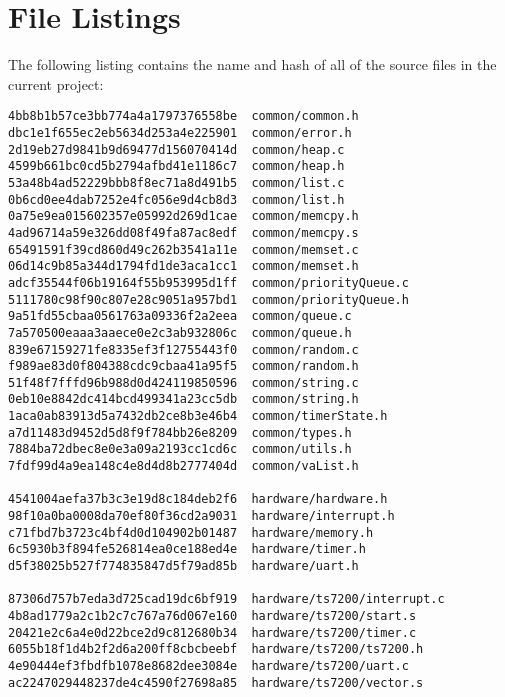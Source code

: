 \documentclass[twoside,a4paper]{refart}
\begin{document}
\section{File Listings}
The following listing contains the name and hash of all of the source files in the current project:
\begin{verbatim}
4bb8b1b57ce3bb774a4a1797376558be  common/common.h
dbc1e1f655ec2eb5634d253a4e225901  common/error.h
2d19eb27d9841b9d69477d156070414d  common/heap.c
4599b661bc0cd5b2794afbd41e1186c7  common/heap.h
53a48b4ad52229bbb8f8ec71a8d491b5  common/list.c
0b6cd0ee4dab7252e4fc056e9d4cb8d3  common/list.h
0a75e9ea015602357e05992d269d1cae  common/memcpy.h
4ad96714a59e326dd08f49fa87ac8edf  common/memcpy.s
65491591f39cd860d49c262b3541a11e  common/memset.c
06d14c9b85a344d1794fd1de3aca1cc1  common/memset.h
adcf35544f06b19164f55b953995d1ff  common/priorityQueue.c
5111780c98f90c807e28c9051a957bd1  common/priorityQueue.h
9a51fd55cbaa0561763a09336f2a2eea  common/queue.c
7a570500eaaa3aaece0e2c3ab932806c  common/queue.h
839e67159271fe8335ef3f12755443f0  common/random.c
f989ae83d0f804388cdc9cbaa41a95f5  common/random.h
51f48f7fffd96b988d0d424119850596  common/string.c
0eb10e8842dc414bcd499341a23cc5db  common/string.h
1aca0ab83913d5a7432db2ce8b3e46b4  common/timerState.h
a7d11483d9452d5d8f9f784bb26e8209  common/types.h
7884ba72dbec8e0e3a09a2193cc1cd6c  common/utils.h
7fdf99d4a9ea148c4e8d4d8b2777404d  common/vaList.h

4541004aefa37b3c3e19d8c184deb2f6  hardware/hardware.h
98f10a0ba0008da70ef80f36cd2a9031  hardware/interrupt.h
c71fbd7b3723c4bf4d0d104902b01487  hardware/memory.h
6c5930b3f894fe526814ea0ce188ed4e  hardware/timer.h
d5f38025b527f774835847d5f79ad85b  hardware/uart.h

87306d757b7eda3d725cad19dc6bf919  hardware/ts7200/interrupt.c
4b8ad1779a2c1b2c7c767a76d067e160  hardware/ts7200/start.s
20421e2c6a4e0d22bce2d9c812680b34  hardware/ts7200/timer.c
6055b18f1d4b2f2d6a200ff8cbcbeebf  hardware/ts7200/ts7200.h
4e90444ef3fbdfb1078e8682dee3084e  hardware/ts7200/uart.c
ac2247029448237de4c4590f27698a85  hardware/ts7200/vector.s


\end{verbatim}
\end{document}
